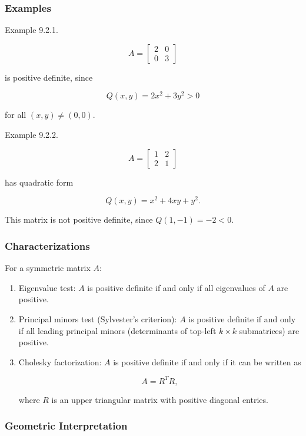 \documentclass[
  12pt,
  a4paper,
]{article}
\begin{document}
\subsubsection{Examples}\label{examples-10}

Example 9.2.1.

\[A = \begin{bmatrix} 2 & 0 \\ 0 & 3 \end{bmatrix}\]

is positive definite, since

\[Q(x,y) = 2x^2 + 3y^2 > 0\]

for all \((x,y) \neq (0,0)\).

Example 9.2.2.

\[A = \begin{bmatrix} 1 & 2 \\ 2 & 1 \end{bmatrix}\]

has quadratic form

\[Q(x,y) = x^2 + 4xy + y^2.\]

This matrix is not positive definite, since \(Q(1,-1) = -2 < 0\).

\subsubsection{Characterizations}\label{characterizations}

For a symmetric matrix \(A\):

\begin{enumerate}
\def\labelenumi{\arabic{enumi}.}
\item
  Eigenvalue test: \(A\) is positive definite if and only if all
  eigenvalues of \(A\) are positive.
\item
  Principal minors test (Sylvester's criterion): \(A\) is positive
  definite if and only if all leading principal minors (determinants of
  top-left \(k \times k\) submatrices) are positive.
\item
  Cholesky factorization: \(A\) is positive definite if and only if it
  can be written as

  \[A = R^T R,\]

  where \(R\) is an upper triangular matrix with positive diagonal
  entries.
\end{enumerate}

\subsubsection{Geometric
Interpretation}\label{geometric-interpretation-21}
\end{document}
